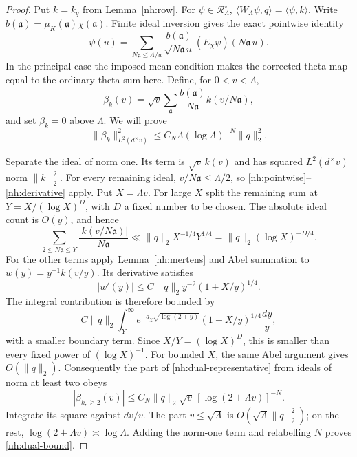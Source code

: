 \begin{proof}
Put $k=k_q$ from Lemma~\ref{nh:row}.
For $\psi\in\mathcal R_\Lambda^\circ$,
$\langle W_\Lambda\psi,q\rangle=\langle\psi,k\rangle$.
Write $b(\mathfrak a)=\mu_K(\mathfrak a)\chi(\mathfrak a)$.
Finite ideal inversion gives the exact pointwise identity
\[
 \psi(u)=\sum_{N\mathfrak a\leq\Lambda/u}
       \frac{b(\mathfrak a)}{\sqrt{N\mathfrak a\,u}}
                    (E_\chi\psi)(N\mathfrak a\,u).
\]
In the principal case the imposed mean condition makes the
corrected theta map equal to the ordinary theta sum here.
Define, for $0<v<\Lambda$,
\begin{equation}\label{nh:dual-representative}
 \beta_k(v)=\sqrt v\sum_{\mathfrak a}
       \frac{\overline{b(\mathfrak a)}}{N\mathfrak a}
                                      k(v/N\mathfrak a),
\end{equation}
and set $\beta_k=0$ above $\Lambda$.
We will prove
\begin{equation}\label{nh:dual-bound}
 \|\beta_k\|_{L^2(d^\times v)}^2
       \leq C_N\Lambda(\log\Lambda)^{-N}\|q\|_2^2.
\end{equation}

Separate the ideal of norm one. Its term is $\sqrt v\,k(v)$
and has squared $L^2(d^\times v)$ norm $\|k\|_2^2$.
For every remaining ideal, $v/N\mathfrak a\leq\Lambda/2$,
so \eqref{nh:pointwise}--\eqref{nh:derivative} apply.
Put $X=\Lambda v$. For large $X$ split the remaining sum at
$Y=X/(\log X)^D$, with $D$ a fixed number to be chosen.
The absolute ideal count is $O(y)$, and hence
\[
 \sum_{2\leq N\mathfrak a\leq Y}
     \frac{|k(v/N\mathfrak a)|}{N\mathfrak a}
 \ll\|q\|_2 X^{-1/4}Y^{1/4}
 =\|q\|_2(\log X)^{-D/4}.
\]
For the other terms apply Lemma~\ref{nh:mertens} and Abel
summation to $w(y)=y^{-1}k(v/y)$. Its derivative satisfies
\[
 |w'(y)|\leq C\|q\|_2y^{-2}(1+X/y)^{1/4}.
\]
The integral contribution is therefore bounded by
\[
 C\|q\|_2\int_Y^\infty
 e^{-a_\chi\sqrt{\log(2+y)}}(1+X/y)^{1/4}\frac{dy}{y},
\]
with a smaller boundary term. Since $X/Y=(\log X)^D$,
this is smaller than every fixed power of $(\log X)^{-1}$.
For bounded $X$, the same Abel argument gives $O(\|q\|_2)$.
Consequently the part of \eqref{nh:dual-representative}
from ideals of norm at least two obeys
\[
 |\beta_{k,\geq2}(v)|
 \leq C_N\|q\|_2\sqrt v\,
               [\log(2+\Lambda v)]^{-N}.
\]
Integrate its square against $dv/v$. The part
$v\leq\sqrt\Lambda$ is $O(\sqrt\Lambda\|q\|_2^2)$;
on the rest, $\log(2+\Lambda v)\asymp\log\Lambda$.
Adding the norm-one term and relabelling $N$ proves
\eqref{nh:dual-bound}.


\end{proof}
